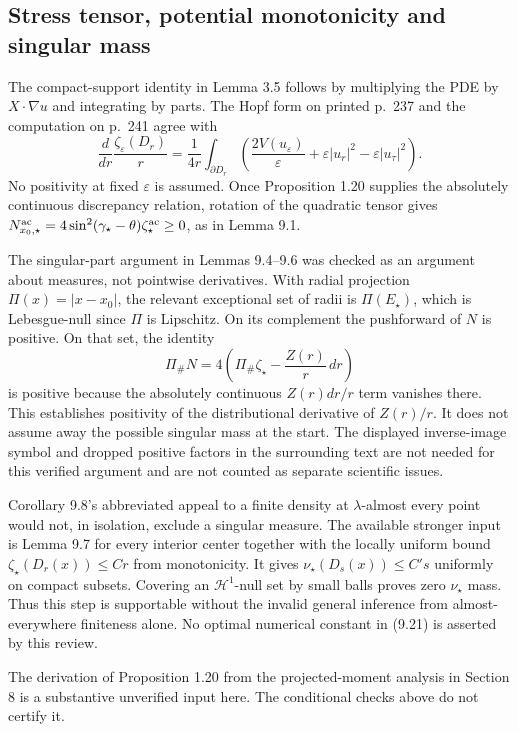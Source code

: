 \documentclass[10pt]{article}
\begin{document}
\subsection*{Stress tensor, potential monotonicity and singular mass}
The compact-support identity in Lemma 3.5 follows by multiplying the PDE by \(X\cdot\nabla u\) and integrating by parts. The Hopf form on printed p. 237 and the computation on p. 241 agree with \[\frac{d}{dr}\frac{\zeta_\varepsilon(D_r)}r
 =\frac1{4r}\int_{\partial D_r}
 \left(\frac{2V(u_\varepsilon)}{\varepsilon}
       +\varepsilon|u_r|^2-\varepsilon|u_\tau|^2\right).\] No positivity at fixed \(\varepsilon\) is assumed. Once Proposition 1.20 supplies the absolutely continuous discrepancy relation, rotation of the quadratic tensor gives \(N^{\rm ac}_{x_0,\star}=4\sin^2(\gamma_\star-\theta)\zeta_\star^{\rm ac}\ge0\), as in Lemma 9.1.\par
The singular-part argument in Lemmas 9.4–9.6 was checked as an argument about measures, not pointwise derivatives. With radial projection \(\Pi(x)=|x-x_0|\), the relevant exceptional set of radii is \(\Pi(E_\star)\), which is Lebesgue-null since \(\Pi\) is Lipschitz. On its complement the pushforward of \(N\) is positive. On that set, the identity \[\Pi_\#N=4\left(\Pi_\#\zeta_\star-\frac{Z(r)}r\,dr\right)\] is positive because the absolutely continuous \(Z(r)dr/r\) term vanishes there. This establishes positivity of the distributional derivative of \(Z(r)/r\). It does not assume away the possible singular mass at the start. The displayed inverse-image symbol and dropped positive factors in the surrounding text are not needed for this verified argument and are not counted as separate scientific issues.\par
Corollary 9.8’s abbreviated appeal to a finite density at \(\lambda\)-almost every point would not, in isolation, exclude a singular measure. The available stronger input is Lemma 9.7 for every interior center together with the locally uniform bound \(\zeta_\star(D_r(x))\le C r\) from monotonicity. It gives \(\nu_\star(D_s(x))\le C' s\) uniformly on compact subsets. Covering an \(\mathcal H^1\)-null set by small balls proves zero \(\nu_\star\) mass. Thus this step is supportable without the invalid general inference from almost-everywhere finiteness alone. No optimal numerical constant in (9.21) is asserted by this review.\par
The derivation of Proposition 1.20 from the projected-moment analysis in Section 8 is a substantive unverified input here. The conditional checks above do not certify it.\par
\end{document}
